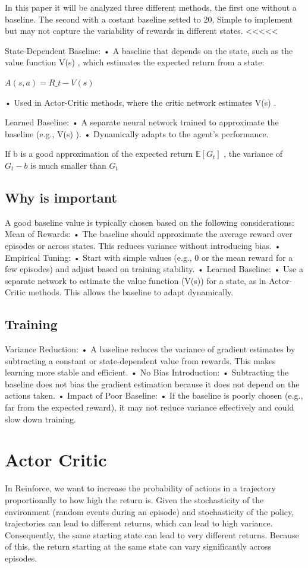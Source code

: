 \documentclass{article}
\begin{document}
In this paper it will be analyzed three different methods, the first one without a baseline. The second with a costant baseline setted to 20, Simple to implement but may not capture the variability of rewards in different states. <<<<<

State-Dependent Baseline:
•	A baseline that depends on the state, such as the value function  V(s) , which estimates the expected return from a state:

$A(s, a) = R\_t - V(s)$

•	Used in Actor-Critic methods, where the critic network estimates  V(s) .

Learned Baseline:
•	A separate neural network trained to approximate the baseline (e.g.,  V(s) ).
•	Dynamically adapts to the agent’s performance.

If  b  is a good approximation of the expected return  $\mathbb{E}[G_t]$ , the variance of  $G_t - b$  is much smaller than  $G_t $

\subsection{Why is important}
A good baseline value is typically chosen based on the following considerations:
Mean of Rewards:
•	The baseline should approximate the average reward over episodes or across states. This reduces variance without introducing bias.
•	Empirical Tuning:
•	Start with simple values (e.g., 0 or the mean reward for a few episodes) and adjust based on training stability.
•	Learned Baseline:
•	Use a separate network to estimate the value function (V(s)) for a state, as in Actor-Critic methods. This allows the baseline to adapt dynamically.

\subsection{Training}
Variance Reduction:
•	A baseline reduces the variance of gradient estimates by subtracting a constant or state-dependent value from rewards. This makes learning more stable and efficient.
•	No Bias Introduction:
•	Subtracting the baseline does not bias the gradient estimation because it does not depend on the actions taken.
•	Impact of Poor Baseline:
•	If the baseline is poorly chosen (e.g., far from the expected reward), it may not reduce variance effectively and could slow down training.


\section{Actor Critic}
In Reinforce, we want to increase the probability of actions in a trajectory proportionally to how high the return is.
Given the stochasticity of the environment (random events during an episode) and stochasticity of the policy, trajectories can lead to different returns, which can lead to high variance. Consequently, the same starting state can lead to very different returns. Because of this, the return starting at the same state can vary significantly across episodes.
\end{document}
